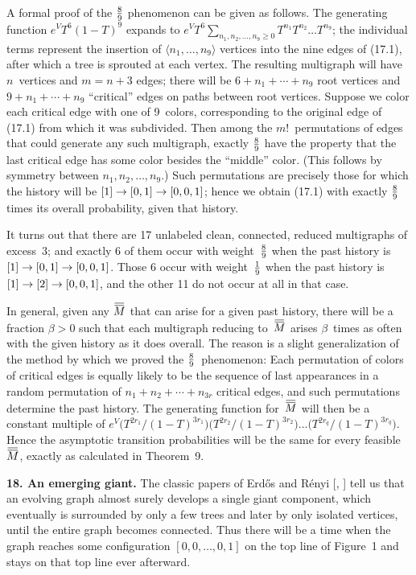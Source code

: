 A formal proof of the ${8\over 9}$ phenomenon can be given as follows.
The generating function $e^VT^6(1-T)^9$ expands to
$e^VT^6\sum_{n_1,n_2,\ldots,n_9\geq 0}T^{n_1}T^{n_2}\ldots T^{n_9}$;
 the individual terms represent the insertion of $\langle
n_1,\ldots,n_9\rangle$ vertices into the nine edges of (17.1), after
which a tree is sprouted at each vertex. The resulting multigraph will
have $n$~vertices and $m=n+3$ edges; there will be $6+n_1+\cdots +n_9$
root vertices and $9+n_1+\cdots +n_9$ ``critical'' edges on paths
between root vertices. Suppose we color each critical edge with one of
9~colors, corresponding to the original edge of (17.1) from which it
was subdivided. Then among the $m!$~permutations of edges that could
generate any such multigraph, exactly ${8\over 9}$ have the property
that the last critical edge has some color besides the ``middle''
color. (This follows by symmetry between $n_1,n_2,\ldots,n_9$.) Such
permutations are precisely those for which the history will be $[1]\rightarrow
 [0,1]\rightarrow [0,0,1]$; hence we obtain (17.1) with exactly ${8\over 9}$
times its overall probability, given that history.

It turns out that there are 17 unlabeled clean, connected, reduced multigraphs
of excess~3; and exactly 6 of them occur with weight~${8\over 9}$ when
the past history is $[1]\rightarrow[0,1]\rightarrow[0,0,1]$. Those 6 occur with
weight~${1\over 9}$ when the past history is
$[1]\rightarrow[2]\rightarrow[0,0,1]$, and the other 11 do not occur at all in that
case.

In general, given any $\MM$ that can arise for a given past history,
there will be a fraction $\beta >0$ such that each multigraph reducing
to~$\MM$ arises $\beta$~times as often with the given history as it
does overall. The reason is a slight generalization of the method by
which we proved the ${8\over 9}$~phenomenon: Each permutation of
colors of critical edges is equally likely to be the sequence of last
appearances in a random permutation of $n_1+n_2+\cdots+n_{3r}$
critical edges, and such permutations determine the past history. The
generating function for~$\MM$ will then be a constant multiple of
$e^V\bigl(T^{2r_1}/(1-T)^{3r_1}\bigr)\bigl(T^{2r_2}/(1-T)^{3r_2}\bigr)\ldots
\allowbreak
{\bigl(T^{2r_q}/(1-T)^{3r_q}\bigr)}$. Hence the asymptotic transition
probabilities will be the same for every feasible~$\MM$, exactly as
calculated in Theorem~9.\quad\pfbox

\bigbreak\noindent
{\bf 18. An emerging giant.}\enspace
The classic papers of Erd{\H o}s and R\'enyi [\ERo, \ER] tell us that
an evolving graph almost surely develops a single giant component,
which eventually is surrounded by only a few trees and later by only
isolated vertices, until the entire graph becomes connected. Thus
there will be a time when the graph reaches some configuration
$[0,0,\ldots,0,1]$ on the top line of Figure~1 and stays on that top
line ever afterward.

